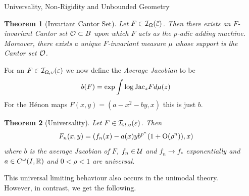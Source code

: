\documentclass[final,hyperref={pdfpagelabels=false}]{beamer}
\theoremstyle{plain}%
\newtheorem{thm}{Theorem}
\theoremstyle{definition}
\theoremstyle{remark}
\begin{document}
\begin{frame}{}
\begin{columns}[t]
\begin{column}{0.3\linewidth}
\end{column}
\begin{column}{0.3\linewidth}
\begin{block}{Universality, Non-Rigidity and Unbounded Geometry}
\begin{thm}[Invariant Cantor Set]
Let $F\in\I_{\Omega}(\bar\e)$. Then there exists an $F$-invariant Cantor set $\Cantor\subset B$ upon which $F$ acts as the $p$-adic adding machine.  Moreover, there exists a unique $F$-invariant measure $\mu$ whose support is the Cantor set $\Cantor$.
\end{thm}
For an $F\in\I_{\Omega,\perm}(\e)$ we now define the \emph{Average Jacobian} to be
\begin{equation}
b(F)=\exp\int\log \jac{F}{z} d\mu(z)
\end{equation}
For the H\'enon maps $F(x,y)=(a-x^2-by,x)$ this is just $b$.

\vskip 10pt

\begin{thm}[Universality]
Let $F\in\I_{\Omega,\perm}(\bar\e)$. Then
\begin{equation}
F_n(x,y)=(f_n(x)-a(x)yb^{p^n}(1+\bigo(\rho^n)),x)
\end{equation}
\vspace{0.15in}
where $b$ is the average Jacobian of $F$, $f_n\in\U$ and $f_n\to f_*$ exponentially and $a\in C^\omega(I,\RR)$ and $0<\rho<1$ are universal.
\end{thm}
This universal limiting behaviour also occurs in the unimodal theory.
However, in contrast, we get the following.

\vskip 10pt


\end{block}
\end{column}
\end{columns}
\end{frame}
\end{document}
